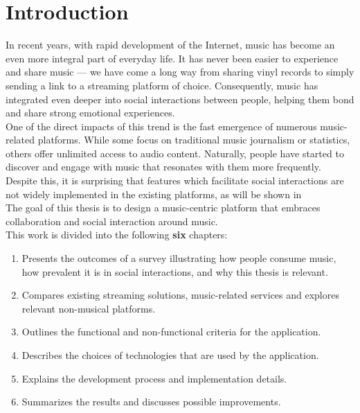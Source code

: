 \chapter{Introduction}\label{chap:intro}


In recent years, with rapid development of the Internet,
music has become an even more integral part of everyday life.\cite{music_role_life}
It has never been easier to experience and share music — we have come
a long way from sharing vinyl records to simply sending a link to a streaming platform of choice.
Consequently, music has integrated even deeper into social interactions between people,
helping them bond and share strong emotional experiences.\cite{music_role_life}
\\
One of the direct impacts of this trend is the fast emergence of numerous music-related platforms.
While some focus on traditional music journalism or statistics, others offer unlimited access to audio content.
Naturally, people have started to discover and engage with music that resonates with them more frequently.\cite{music_role_life}
\\
Despite this, it is surprising that features which facilitate social interactions are not widely implemented in the
existing platforms, as will be shown in 
\\
The goal of this thesis is to design a music-centric platform that embraces
collaboration and social interaction around music.
\\
This work is divided into the following \textbf{six} chapters:

\begin{enumerate}
    \item \textbf{}
    Presents the outcomes of a survey illustrating how people consume music,
    how prevalent it is in social interactions, and why this thesis is relevant.

    \item \textbf{}
    Compares existing streaming solutions, music-related services
    and explores relevant non-musical platforms.

    \item \textbf{}
    Outlines the functional and non-functional criteria for the application.

    \item \textbf{}
    Describes the choices of technologies that are used by the application.

    \item \textbf{}
    Explains the development process and implementation details.

    \item \textbf{}
    Summarizes the results and discusses possible improvements.
\end{enumerate}